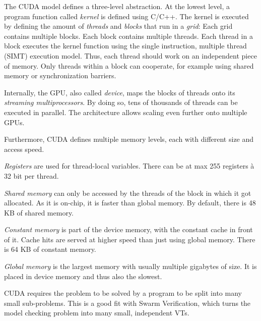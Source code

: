 \documentclass[
fancyheadings, %
%
%
]{stsreprt}
\begin{document}
The CUDA model defines a three-level abstraction.
At the lowest level, a program function called \emph{kernel} is defined using C/C++.
The kernel is executed by defining the amount of \emph{threads} and \emph{blocks} that run in a \emph{grid}:
Each grid contains multiple blocks.
Each block contains multiple threads.
Each thread in a block executes the kernel function using the single instruction, multiple thread (SIMT) execution model.
Thus, each thread should work on an independent piece of memory.
Only threads within a block can cooperate, for example using shared memory or synchronization barriers.

Internally, the GPU, also called \emph{device}, maps the blocks of threads onto its \emph{streaming multiprocessors}.
By doing so, tens of thousands of threads can be executed in parallel.
The architecture allows scaling even further onto multiple GPUs.

Furthermore, CUDA defines multiple memory levels, each with different size and access speed.

\emph{Registers} are used for thread-local variables.
There can be at max 255 registers à 32 bit per thread.


\emph{Shared memory} can only be accessed by the threads of the block in which it got allocated.
As it is on-chip, it is faster than global memory.
By default, there is 48 KB of shared memory.

\emph{Constant memory} is part of the device memory, with the constant cache in front of it.
Cache hits are served at higher speed than just using global memory.
There is 64 KB of constant memory.


\emph{Global memory} is the largest memory with usually multiple gigabytes of size.
It is placed in device memory and thus also the slowest.

CUDA requires the problem to be solved by a program to be split into many small sub-problems.
This is a good fit with Swarm Verification, which turns the model checking problem into many small, independent VTs.


\end{document}
